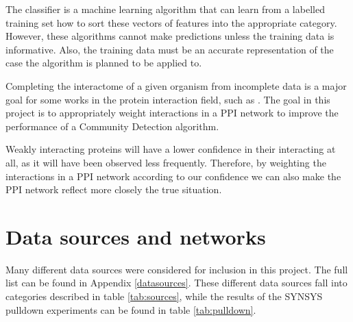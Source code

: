 The classifier is a machine learning algorithm that can learn from a labelled training set how to sort these vectors of features into the appropriate category. %
However, these algorithms cannot make predictions unless the training data is informative.   
Also, the training data must be an accurate representation of the case the algorithm is planned to be applied to. %

Completing the interactome of a given organism from incomplete data is a major goal for some works in the protein interaction field, such as \textcite{rodgers-melnick_predicting_2013}.
The goal in this project is to appropriately weight interactions in a \ac{PPI} network to improve the performance of a Community Detection algorithm.

Weakly interacting proteins will have a lower confidence in their interacting at all, as it will have been observed less frequently.
Therefore, by weighting the interactions in a \ac{PPI} network according to our confidence we can also make the \ac{PPI} network reflect more closely the true situation. %

\section{Data sources and networks}
\label{back:sources}

Many different data sources were considered for inclusion in this project. %
The full list can be found in Appendix \ref{datasources}.
These different data sources fall into categories described in table \ref{tab:sources}, while the results of the SYNSYS pulldown experiments can be found in table \ref{tab:pulldown}.


